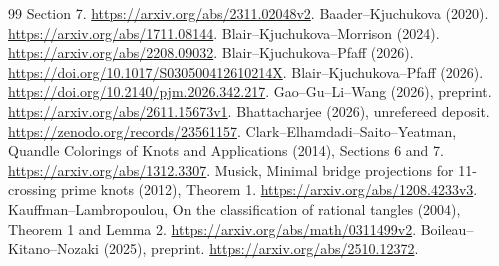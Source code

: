 \documentclass[11pt]{article}
\begin{document}
{\begin{thebibliography}{99}
Section 7. \url{https://arxiv.org/abs/2311.02048v2}.
 Baader--Kjuchukova (2020).
\url{https://arxiv.org/abs/1711.08144}.
 Blair--Kjuchukova--Morrison (2024).
\url{https://arxiv.org/abs/2208.09032}.
 Blair--Kjuchukova--Pfaff (2026).
\url{https://doi.org/10.1017/S030500412610214X}.
 Blair--Kjuchukova--Pfaff (2026).
\url{https://doi.org/10.2140/pjm.2026.342.217}.
 Gao--Gu--Li--Wang (2026), preprint.
\url{https://arxiv.org/abs/2611.15673v1}.
 Bhattacharjee (2026), unrefereed deposit.
\url{https://zenodo.org/records/23561157}.
 Clark--Elhamdadi--Saito--Yeatman, Quandle Colorings of
Knots and Applications (2014), Sections 6 and 7.
\url{https://arxiv.org/abs/1312.3307}.
 Musick, Minimal bridge projections for 11-crossing
prime knots (2012), Theorem 1. \url{https://arxiv.org/abs/1208.4233v3}.
 Kauffman--Lambropoulou, On the classification of rational
tangles (2004), Theorem 1 and Lemma 2.
\url{https://arxiv.org/abs/math/0311499v2}.
 Boileau--Kitano--Nozaki (2025), preprint.
\url{https://arxiv.org/abs/2510.12372}.
\end{thebibliography}
}
\end{document}
